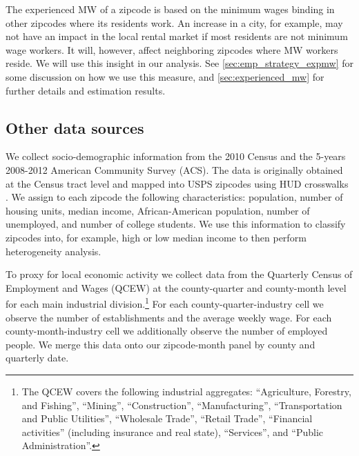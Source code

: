 The experienced MW of a zipcode is based on the minimum wages binding in other zipcodes 
where its residents work. An increase in a city, for example, may not have an impact in 
the local rental market if most residents are not minimum wage workers. It will, however, 
affect neighboring zipcodes where MW workers reside. We will use this insight in our 
analysis. See \autoref{sec:emp_strategy_expmw} for some discussion on how we use this 
measure, and \autoref{sec:experienced_mw} for further details and estimation results.

\subsection{Other data sources}\label{sec:data/other_data}

We collect socio-demographic information from the 2010 Census and the 5-years 2008-2012 
American Community Survey (ACS). The data is originally obtained at the Census tract 
level and mapped into USPS zipcodes using HUD crosswalks \parencite{hudCrosswalks}. We 
assign to each zipcode the following characteristics: population, number of housing units, 
median income, African-American population, number of unemployed, and number of college 
students. We use this information to classify zipcodes into, for example, high or low median 
income to then perform heterogeneity analysis.

To proxy for local economic activity we collect data from the Quarterly Census of 
Employment and Wages (QCEW) at the county-quarter and county-month level for each main 
industrial division.\footnote{The QCEW covers the following industrial aggregates: 
	``Agriculture, Forestry, and Fishing'', ``Mining'', ``Construction'', ``Manufacturing'', 
	``Transportation and Public Utilities'', ``Wholesale Trade'', ``Retail Trade'',
	``Financial activities'' (including insurance and real state), ``Services'', and 
	``Public Administration''.}
For each county-quarter-industry cell we observe the number of establishments and the 
average weekly wage. For each county-month-industry cell we additionally observe the number 
of employed people. We merge this data onto our zipcode-month panel by county and 
quarterly date.


